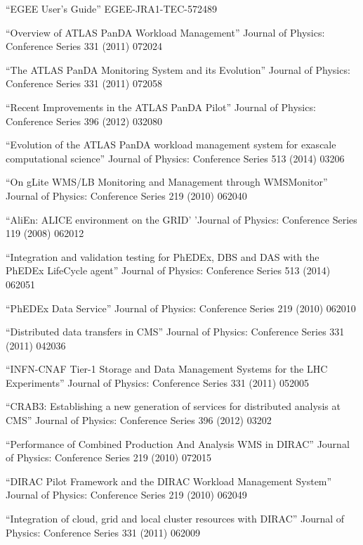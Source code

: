 \begin{thebibliography}{99}
 ``EGEE User’s Guide'' EGEE-JRA1-TEC-572489

 ``Overview of ATLAS PanDA Workload Management'' Journal of Physics: Conference Series 331 (2011) 072024

 ``The ATLAS PanDA Monitoring System and its Evolution'' Journal of Physics: Conference Series 331 (2011) 072058

 ``Recent Improvements in the ATLAS PanDA Pilot'' Journal of Physics: Conference Series 396 (2012) 032080

 ``Evolution of the ATLAS PanDA workload management system for exascale computational science'' Journal of Physics: Conference Series 513 (2014) 03206

 ``On gLite WMS/LB Monitoring and Management through WMSMonitor'' Journal of Physics: Conference Series 219 (2010) 062040

 ``AliEn: ALICE environment on the GRID' 'Journal of Physics: Conference Series 119 (2008) 062012

 ``Integration and validation testing for PhEDEx, DBS and DAS with the PhEDEx LifeCycle agent'' Journal of Physics: Conference Series 513 (2014) 062051

 ``PhEDEx Data Service'' Journal of Physics: Conference Series 219 (2010) 062010

 ``Distributed data transfers in CMS'' Journal of Physics: Conference Series 331 (2011) 042036

 ``INFN-CNAF Tier-1 Storage and Data Management Systems for the LHC Experiments'' Journal of Physics: Conference Series 331 (2011) 052005

 ``CRAB3: Establishing a new generation of services for distributed analysis at CMS'' Journal of Physics: Conference Series 396 (2012) 03202

 ``Performance of Combined Production And Analysis WMS in DIRAC'' Journal of Physics: Conference Series 219 (2010) 072015

 ``DIRAC Pilot Framework and the DIRAC Workload Management System'' Journal of Physics: Conference Series 219 (2010) 062049

 ``Integration of cloud, grid and local cluster resources with DIRAC'' Journal of Physics: Conference Series 331 (2011) 062009


\end{thebibliography}
